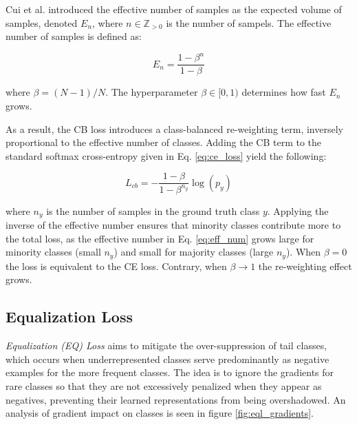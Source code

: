 \noindent Cui et al. \cite{cui2019classbalancedlossbasedeffective} introduced the effective number of samples as the expected volume of samples, denoted $E_n$, where $n \in \mathbb{Z}_{>0}$ is the number of sampels. The effective number of samples 
is defined as:

\begin{equation}
    \label{eq:eff_num}
    E_n = \frac{1-\beta^n}{1-\beta}
\end{equation}

\noindent where $\beta = (N-1)/N$. The hyperparameter $\beta \in [0,1)$ determines how fast $E_n$ grows.

As a result, the CB loss introduces a class-balanced re-weighting term, inversely proportional to the effective number of classes. Adding the CB term to the standard softmax cross-entropy given in Eq. \eqref{eq:ce_loss} yield the following:

\begin{equation}
    \label{eq:cb_loss}
    L_{cb} = - \frac{1 - \beta}{1 - \beta^{n_y}} \log(p_y)
\end{equation}

\noindent where $n_y$ is the number of samples in the ground truth class $y$. Applying the inverse of the effective number ensures that minority classes contribute more to the total loss, as the effective number in Eq. \eqref{eq:eff_num} grows large for minority classes (small $n_y$) and small for majority classes (large $n_y$). When $\beta = 0$ the loss is equivalent to the CE loss. Contrary, when $\beta \longrightarrow 1$ the re-weighting effect grows.


\subsection{Equalization Loss}
\label{sec:seql}
\emph{Equalization (EQ) Loss} \cite{tan2020equalizationlosslongtailedobject} aims to mitigate the over-suppression of tail classes, which occurs when underrepresented classes serve predominantly as negative examples for the more frequent classes. The idea is to ignore the gradients for rare classes so that they are not excessively penalized when they appear as negatives, preventing their learned representations from being overshadowed. An analysis of gradient impact on classes is seen in figure \ref{fig:eql_gradients}.

